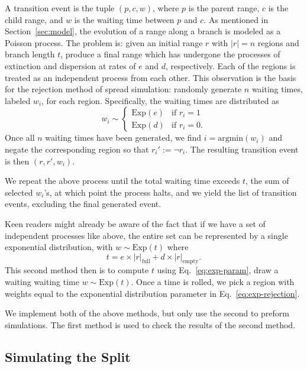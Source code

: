 \documentclass[a4paper]{article}
\newcommand{\CountFull}[1]{|#1|_\text{full}}
\newcommand{\CountEmpty}[1]{|#1|_\text{empty}}
\newcommand{\rneg}[1]{\neg #1}
\begin{document}
A transition event is the tuple $(p, c, w)$, where $p$ is the parent range, $c$ is the child range, and $w$ is the
waiting time between $p$ and $c$.
As mentioned in Section~\ref{sec:model}, the evolution of a range along a branch is modeled as a Poisson process.
The problem is: given an initial range \( r \) with \( |r| = n \) regions and branch length \( t \), produce a final range which
has undergone the processes of extinction and dispersion at rates of \( e \) and \( d \), respectively.
Each of the regions is treated as an independent process from each other.
This observation is the basis for the rejection method of spread simulation: randomly generate \( n \) waiting times,
labeled \( w_i \), for each region.
Specifically, the waiting times are distributed as
\begin{equation}
	\label{eq:exp-rejection} w_i \sim
	\begin{cases}
		\text{Exp}(e) & \text{if } r_i = 1 \\
    \text{Exp}(d) & \text{if } r_i = 0.
	\end{cases}
\end{equation}
Once all $n$ waiting times have been generated, we find $ i = \text{argmin}(w_i)$ and negate the corresponding
region so that $r_i' := \rneg{r_i}$.
The resulting transition event is then $(r, r', w_i)$.

We repeat the above process until the total waiting time exceeds $t$, the sum of selected $w_i$'s, at which point the
process halts, and we yield the list of transition events, excluding the final generated event.

Keen readers might already be aware of the fact that if we have a set of
independent processes like above, the entire set can be represented by a single
exponential distribution, with \(w \sim \text{Exp}(t) \) where
\begin{equation}
	\label{eq:exp-param} t = e \times \CountFull{r} + d \times \CountEmpty{r}.
\end{equation}
This second method then is to compute \( t \) using Eq.~\ref{eq:exp-param},
draw a waiting waiting time \( w \sim \text{Exp}(t) \).
Once a time is rolled, we pick a region with weights equal to the exponential
distribution parameter in Eq.~\ref{eq:exp-rejection}.

We implement both of the above methods, but only use the second to preform
simulations.
The first method is used to check the results of the second method.

\subsection{Simulating the Split}
\end{document}
